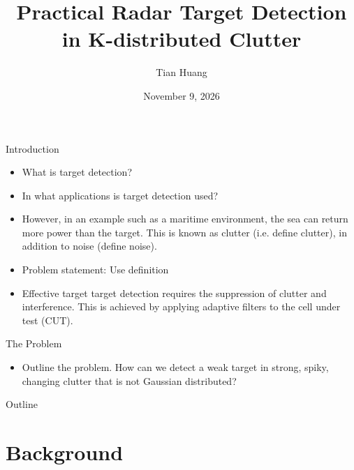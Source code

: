 \documentclass{beamer}
\title[Practical Radar Target Detection in K-distributed Clutter]{Practical Radar Target Detection in K-distributed Clutter}
\author[]{Tian Huang}
\institute[]{Supervisor: Prof. Elias Aboutanios}
\date{November 9, 2026}
\begin{document}

\begin{frame}	
    \titlepage	%
\end{frame}		

\begin{frame}{Introduction}
    \begin{itemize}
        \item What is target detection?
        \item In what applications is target detection used?
        \item However, in an example such as a maritime environment, the sea can return more power than the target. This is known as clutter (i.e. define clutter), in addition to noise (define noise).
        \item Problem statement: Use definition
        \item Effective target target detection requires the suppression of clutter and interference. This is achieved by applying adaptive filters to the cell under test (CUT).
    \end{itemize}

    \pause
    
    \begin{block}{The Problem}
        \begin{itemize}
            \item Outline the problem. How can we detect a weak target in strong, spiky, changing clutter that is not Gaussian distributed?
        \end{itemize}     
    \end{block}
\end{frame}

\begin{frame}{Outline}
  \tableofcontents  
\end{frame}

\section{Background}

\end{document}

